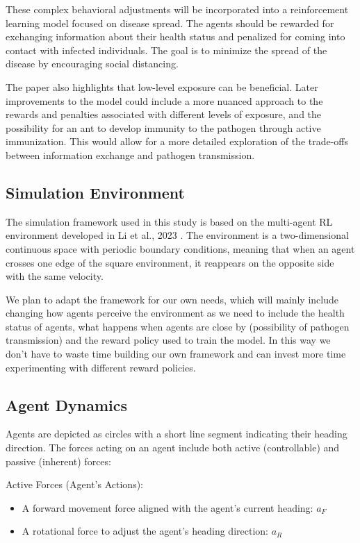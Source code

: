 \documentclass[9pt]{IEEEtran}
\begin{document}
These complex behavioral adjustments will be incorporated into a reinforcement learning model focused on disease spread. The agents should be rewarded for exchanging information about their health status and penalized for coming into contact with infected individuals. The goal is to minimize the spread of the disease by encouraging social distancing.

The paper also highlights that low-level exposure can be beneficial. Later improvements to the model could include a more nuanced approach to the rewards and penalties associated with different levels of exposure, and the possibility for an ant to develop immunity to the pathogen through active immunization. This would allow for a more detailed exploration of the trade-offs between information exchange and pathogen transmission.

\subsection{Simulation Environment}

The simulation framework used in this study is based on the multi-agent RL environment developed in Li et al., 2023 \cite{li2023predator}. The environment is a two-dimensional continuous space with periodic boundary conditions, meaning that when an agent crosses one edge of the square environment, it reappears on the opposite side with the same velocity.

We plan to adapt the framework for our own needs, which will mainly include changing how agents perceive the environment as we need to include the health status of agents, what happens when agents are close by (possibility of pathogen transmission) and the reward policy used to train the model. In this way we don't have to waste time building our own framework and can invest more time experimenting with different reward policies.

\subsection{Agent Dynamics}

Agents are depicted as circles with a short line segment indicating their heading direction. The forces acting on an agent include both active (controllable) and passive (inherent) forces:

Active Forces (Agent's Actions):
\begin{itemize}
    \item A forward movement force aligned with the agent's current heading: $a_F$
    \item A rotational force to adjust the agent's heading direction: $a_R$
\end{itemize}
\end{document}

